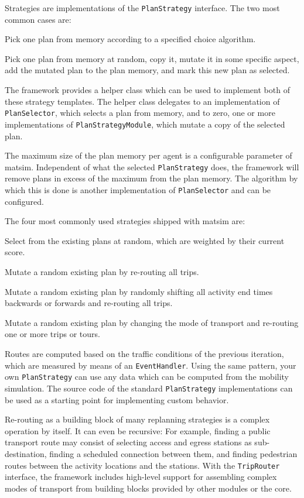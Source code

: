 Strategies are implementations of the \lstinline|PlanStrategy| interface. 
The two most common cases are:
\begin{compactitem}
\item Pick one plan from memory according to a specified choice algorithm.
\item Pick one plan from memory
at random, copy it, mutate it in some specific aspect, add the mutated plan to the plan memory, and
mark this new plan as selected.
\end{compactitem}

The framework provides a helper class which can be used to implement both of these strategy templates. 
The helper class delegates to an implementation of \lstinline|PlanSelector|, which selects a plan from memory, 
and to zero, one or more implementations of \lstinline|PlanStrategyModule|, which mutate a copy of the selected plan.

The maximum size of the plan memory per agent is a configurable parameter of \gls{matsim}. Independent
 of what the selected \lstinline|PlanStrategy| does, the framework will remove plans in excess
 of the maximum from the plan memory. The algorithm by which this is done is another implementation
 of \lstinline|PlanSelector| and can be configured. 

The four most commonly used strategies shipped with \gls{matsim} are:
\begin{compactitem}
\item Select from the existing plans at random, which are weighted by their current score.
\item Mutate a random existing plan by re-routing all trips.
\item Mutate a random existing plan by randomly shifting all activity end times backwards or forwards and re-routing 
all trips.
\item Mutate a random existing plan by changing the mode of transport and re-routing one or more trips or tours.
\end{compactitem}

Routes are computed based on the traffic conditions of the previous iteration, which are measured
by means of an \lstinline|EventHandler|. Using the same pattern, your own \lstinline|PlanStrategy| can use any data which
can be computed from the mobility simulation. The source code of the standard \lstinline|PlanStrategy| implementations can be 
used as a starting point for implementing custom behavior.

Re-routing as a building block of many \gls{replanning} strategies is a complex operation by itself. It can
even be recursive: For example, finding a public transport route may consist of selecting access and egress stations as
sub-destination, finding a scheduled connection between them, and finding pedestrian routes between the
activity locations and the stations. With the \lstinline|TripRouter| interface, the framework includes high-level 
support for assembling complex modes of transport from building blocks provided by other modules or the core. 
  
